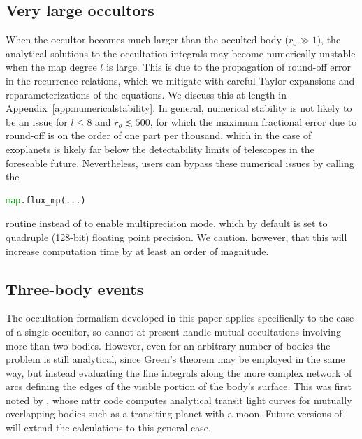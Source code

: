 \documentclass[modern]{aastex61}
\begin{document}
\subsection{Very large occultors}
When the occultor becomes much larger than the occulted body ($r_o \gg 1$),
the analytical solutions to the occultation integrals may become numerically
unstable when the map degree $l$ is large. This is due to the propagation of
round-off error in the recurrence relations, which we mitigate
with careful Taylor expansions and reparameterizations of the equations.
We discuss this at length in Appendix~\ref{app:numericalstability}.
In general, numerical stability is
not likely to be an issue for $l \leq 8$ and $r_o \lesssim 500$, for which
the maximum fractional error due to round-off is on the order of one part
per thousand, which in the case of exoplanets is likely far below the
detectability limits of telescopes in the foreseable future. Nevertheless, users
can bypass these numerical issues by calling the
%
\begin{lstlisting}[language=Python,firstnumber=last]
map.flux_mp(...)
\end{lstlisting}
%
routine instead of \starryMapflux to enable multiprecision mode,
which by default is set to quadruple (128-bit) floating point precision.
We caution, however, that this will increase computation time by at least
an order of magnitude.

\subsection{Three-body events}
The occultation formalism developed in this paper applies specifically to the
case of a single occultor, so \starry cannot at present handle mutual occultations
involving more than two bodies. However, even for an arbitrary number of bodies
the problem is still analytical, since Green's theorem may be employed in the same
way, but instead evaluating the line integrals along the more complex network of
arcs defining the edges of the visible portion of the body's surface. This was
first noted by \cite{Pal2012}, whose \textsf{mttr} code computes analytical
transit light curves for mutually overlapping bodies such as a transiting
planet with a moon. Future versions of \starry will extend the calculations
to this general case.

\end{document}
